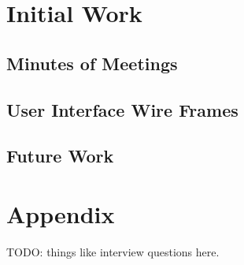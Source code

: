 \documentclass[11pt,a4paper]{article}
\begin{document}
\section{Initial Work}
\label{sec:initial-work}

\subsection{Minutes of Meetings}
\subsection{User Interface Wire Frames}
\subsection{Future Work}
\label{sec:future-work}

\section{Appendix}
TODO: things like interview questions here. 

\newpage


\end{document}
